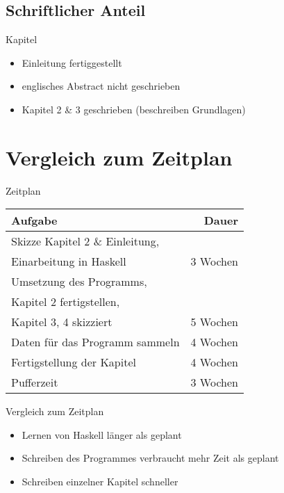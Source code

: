 \documentclass{beamer}
\begin{document}
\subsection{Schriftlicher Anteil}

\begin{frame}{Kapitel}
\begin{itemize}[<+->]
\item Einleitung fertiggestellt
\item englisches \glqq{}Abstract\grqq{} nicht geschrieben
\item Kapitel 2 \& 3 geschrieben (beschreiben Grundlagen)
\end{itemize}
\end{frame}

\section{Vergleich zum Zeitplan}

\begin{frame}{Zeitplan}
\begin{tabular}{|l|r|}
	\hline
	Aufgabe & Dauer \\ \hline
	Skizze Kapitel 2 \& Einleitung, & \\
	Einarbeitung in Haskell & 3 Wochen \\ \hline
	Umsetzung des Programms, & \\
	Kapitel 2 fertigstellen, & \\
	Kapitel 3, 4 skizziert & 5 Wochen \\ \hline
	Daten für das Programm sammeln & 4 Wochen \\ \hline
	Fertigstellung der Kapitel & 4 Wochen \\ \hline
	Pufferzeit & 3 Wochen \\ \hline
\end{tabular}
\end{frame}

\begin{frame}{Vergleich zum Zeitplan}
\begin{itemize}[<+->]
\item Lernen von Haskell länger als geplant
\item Schreiben des Programmes verbraucht mehr Zeit als geplant
\item Schreiben einzelner Kapitel schneller
\end{itemize}
\end{frame}
\end{document}
